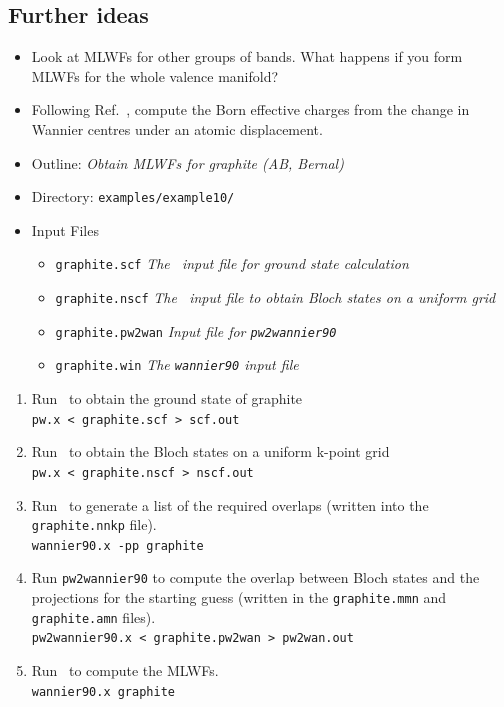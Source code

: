 \documentclass[a4paper,11pt,twoside]{article}
\begin{document}
\subsection*{Further ideas}
\begin{itemize}
\item Look at MLWFs for other groups of bands. What happens if you form
  MLWFs for the whole valence manifold?

\item Following Ref.~\cite{marzari-arxiv98}, compute the Born effective charges from the
  change in Wannier centres under an atomic displacement. 
\end{itemize}


\begin{itemize}
\item{Outline: \it{Obtain MLWFs for graphite (AB, Bernal)}}
\item{Directory: {\tt examples/example10/}}
\item{Input Files}
\begin{itemize}
\item{ {\tt graphite.scf}  {\it The \pwscf\ input file for ground
    state calculation}} 
\item{ {\tt graphite.nscf}  {\it The \pwscf\ input file to obtain Bloch
    states on a uniform grid}} 
\item{ {\tt graphite.pw2wan}  {\it Input file for {\tt pw2wannier90}}}
\item{ {\tt graphite.win}  {\it The {\tt wannier90} input file}}
\end{itemize}
\end{itemize}

\begin{enumerate}
\item Run \pwscf\ to obtain the ground state of graphite\\
{\tt pw.x < graphite.scf > scf.out}

\item Run \pwscf\ to obtain the Bloch states on a uniform k-point grid\\
{\tt pw.x < graphite.nscf > nscf.out}

\item Run \wannier\ to generate a list of the required overlaps (written
  into the {\tt graphite.nnkp} file).\\ 
{\tt wannier90.x -pp graphite}

\item Run {\tt pw2wannier90} to compute the overlap between Bloch
  states and the projections for the starting guess (written in the
  {\tt graphite.mmn} and {\tt graphite.amn} files).\\  
{\tt pw2wannier90.x < graphite.pw2wan > pw2wan.out}

\item Run \wannier\ to compute the MLWFs.\\
{\tt wannier90.x graphite}
\end{enumerate}
\end{document}
